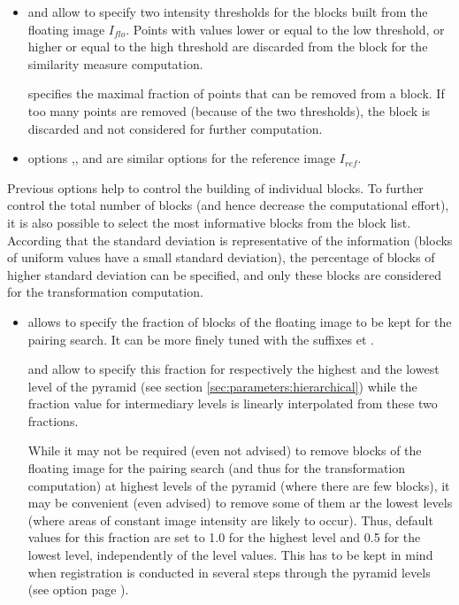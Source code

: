\begin{itemize}
\item[]  and  allow to specify two intensity thresholds for the blocks built from the floating image $I_{flo}$. Points with values lower or equal to the low threshold, or higher or equal to the high threshold are discarded from the block for the similarity measure computation. 

 specifies the maximal fraction of points that can be removed from a block. If too many points are removed (because of the two thresholds), the block is discarded and not considered for further computation.

\item[] options ,, and  are similar options for the reference image $I_{ref}$.

\end{itemize}

Previous options help to control the building of individual blocks. To further control the total number of blocks (and hence decrease the computational effort), it is also possible to select the most informative blocks from the block list. According that the standard deviation is representative of the information (blocks of uniform values have a small standard deviation), the percentage of blocks of higher standard deviation can be specified, and only these blocks are considered for the transformation computation.

\begin{itemize}
\item[] \label{opt:floating:selection:fraction}  allows to specify the fraction of blocks of the floating image to be kept for the pairing search. It can be more finely tuned with the suffixes  et . 

 and
  allow to specify this
fraction for respectively the highest and the lowest level of the
pyramid (see section \ref{sec:parameters:hierarchical}) while the
fraction value for intermediary levels is linearly interpolated from
these two fractions.

While it may not be required (even not advised) to remove blocks of
the floating image for the pairing search (and thus for the
transformation computation) at highest levels of the pyramid (where
there are few blocks), it may be convenient (even advised) to remove
some of them ar the lowest levels (where areas of constant image
intensity are likely to occur). Thus, default values for this fraction
are set to 1.0 for the highest level and 0.5 for the lowest level,
independently of the level values. This has to be kept in mind when
registration is conducted in several steps through the pyramid levels
(see option  page \pageref{opt:initial:result:transformation}).
\end{itemize}


